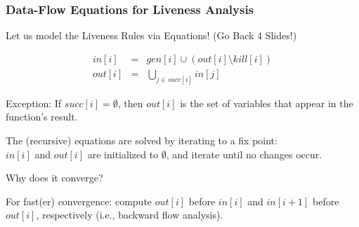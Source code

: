 \documentclass{beamer}
\newcommand{\emp}[1]{\textcolor{DikuRed}{ #1}}
\begin{document}
\begin{frame}
\frametitle{Data-Flow Equations for Liveness Analysis}

\alert{Let us model the Liveness Rules via Equations!} (Go Back 4 Slides!)

\bigskip


\begin{eqnarray}
in[i] & = & gen[i] \cup (out[i] \setminus kill[i]) \label{in-eq}\\
out[i] & = & \bigcup_{j \in succ[i]} in[j] \label{out-eq}
\end{eqnarray}

\bigskip

\emp{Exception:} If $succ[i] = \emptyset$, then $out[i]$ is the set of variables that
appear in the function's result.

\bigskip

\emp{The (recursive) equations are solved by iterating to a fix point:}\\
$in[i]$ and $out[i]$ are initialized to $\emptyset$, and iterate until no changes occur.

\bigskip

\alert{Why does it converge?}

\bigskip

For fast(er) convergence: compute $out[i]$ before $in[i]$ and $in[i+1]$
before $out[i]$, respectively (i.e., \emp{backward flow analysis}).

\end{frame}
\end{document}
